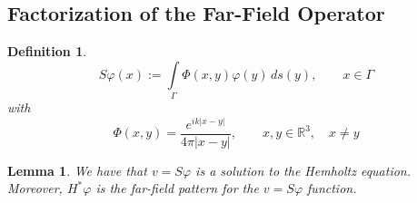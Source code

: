 \documentclass[]{article}
\newtheorem{definition}{Definition}
\newtheorem{lemma}{Lemma}
\newcommand{\R}{\mathbb R}
\begin{document}
			\subsection{Factorization of the Far-Field Operator}
			\begin{definition}
				\begin{equation}
					S\varphi(x) := \int\limits_\Gamma \Phi(x, y) \varphi(y)\, ds(y), \qquad x \in \Gamma
				\end{equation}
				with 
				\begin{equation}
					\Phi(x, y) = \frac{e^{ik|x-y|}}{4\pi|x-y|}, \qquad x, y \in \R^3, \quad x\neq y
				\end{equation}
			\end{definition}
			\begin{lemma}
				We have that $v= S\varphi$ is a solution to the Hemholtz equation. Moreover, $H^\ast \varphi$ is the far-field pattern for the $v = S\varphi$ function.
			\end{lemma}
\end{document}
